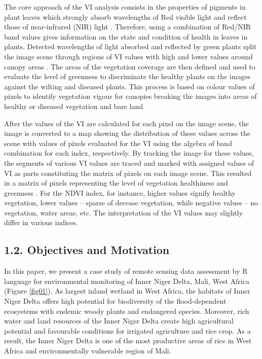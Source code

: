 \documentclass[12pt,a4paper,oneside]{article}
\def \newpar{\vspace{6pt}}
\begin{document}
\newpar The core approach of the VI analysis consists in the properties of pigments in plant leaves which strongly absorb wavelengths of Red visible light and reflect those of near-infrared (NIR) light \citep{rs9050472}. Therefore, using a combination of Red/NIR  band values gives information on the state and condition of health in leaves in plants. Detected wavelengths of light absorbed and reflected by green plants split the image scene through regions of VI values with high and lower values around canopy areas \citep{agronomy9050226,jimaging9050098}. The areas of the vegetation coverage are then defined and used to evaluate the level of greenness to discriminate the healthy plants on the images against the wilting and diseased plants. This process is based on colour values of pixels to identify vegetation vigour for canopies breaking the images into areas of healthy or diseased vegetation and bare land. 

\newpar After the values of the VI are calculated for each pixel on the image scene, the image is converted to a map showing the distribution of these values across the scene with values of pixels evaluated for the VI using the algebra of band combination for each index, respectively. By tracking the image for these values, the segments of various VI values are traced and marked with assigned values of VI as parts constituting the matrix of pixels on each image scene. This resulted in a matrix of pixels representing the level of vegetation healthiness and greenness \citep{agronomy9050238}. For the NDVI index, for instance, higher values signify healthy vegetation, lower values -- sparse of decease vegetation, while negative values -- no vegetation, water areas, etc. The interpretation of the VI values may slightly differ in various indices.

\subsection*{1.2. Objectives and Motivation}

\newpar In this paper, we present a case study of remote sensing data assessment by R language for environmental monitoring of Inner Niger Delta, Mali, West Africa (Figure \ref{fig01}). As largest inland wetland in West Africa, the habitats of Inner Niger Delta offers high potential for biodiversity of the flood-dependent ecosystems with endemic woody plants and endangered species. Moreover, rich water and land resources of the Inner Niger Delta create high agricultural potential and favourable conditions for irrigated agriculture and rice crop. As a result, the Inner Niger Delta is one of the most productive areas of rice in West Africa and environmentally vulnerable region of Mali.
\end{document}
